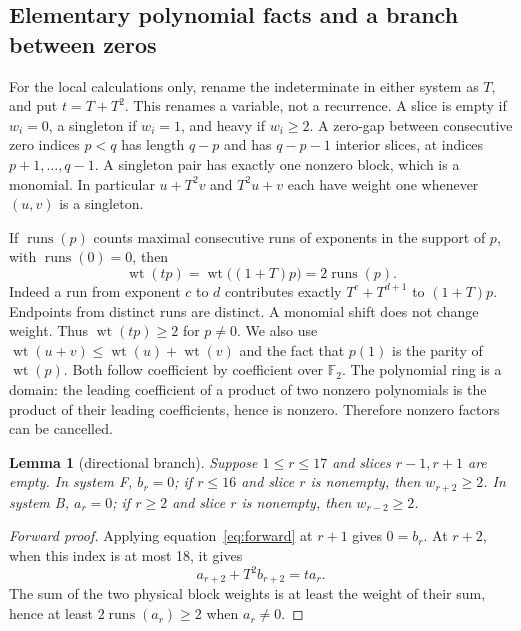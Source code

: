 \documentclass{article}
\newtheorem{lemma}{Lemma}
\DeclareMathOperator{\wt}{wt}
\DeclareMathOperator{\runs}{runs}
\begin{document}
\subsection{Elementary polynomial facts and a branch between zeros}\label{sec:branch}

For the local calculations only, rename the indeterminate in either
system as \(T\), and put \(t = T + T^2\). This renames a variable, not a recurrence.
A slice is empty if \(w_i = 0\), a singleton if \(w_i = 1\), and heavy if \(w_i \ge 2\).
A zero-gap between consecutive zero indices \(p < q\) has length \(q - p\)
and has \(q - p - 1\) interior slices, at indices \(p + 1, \dots, q - 1\).
A singleton pair has exactly one nonzero block, which is a monomial.
In particular \(u + T^2 v\) and \(T^2 u + v\) each have weight one whenever
\((u,v)\) is a singleton.

If \(\runs(p)\) counts maximal consecutive runs of exponents in the support of
\(p\), with \(\runs(0) = 0\), then
\begin{equation}\label{eq:runs}
  \wt(tp) = \wt\bigl((1 + T)p\bigr) = 2 \runs(p).
\end{equation}
Indeed a run from exponent \(c\) to \(d\) contributes exactly \(T^c + T^{d+1}\)
to \((1 + T)p\). Endpoints from distinct runs are distinct. A monomial shift
does not change weight. Thus \(\wt(tp) \ge 2\) for \(p \ne 0\).
We also use \(\wt(u + v) \le \wt(u) + \wt(v)\) and the fact that \(p(1)\) is the parity
of \(\wt(p)\). Both follow coefficient by coefficient over \(\mathbb{F}_2\).
The polynomial ring is a domain: the leading coefficient of a product
of two nonzero polynomials is the product of their leading coefficients,
hence is nonzero. Therefore nonzero factors can be cancelled.

\begin{lemma}[directional branch]\label{lem:branch}
  Suppose \(1 \le r \le 17\) and slices \(r - 1, r + 1\)
  are empty. In system F, \(b_r = 0\); if \(r \le 16\) and slice \(r\) is nonempty,
  then \(w_{r+2} \ge 2\). In system B, \(a_r = 0\); if \(r \ge 2\) and slice \(r\) is
  nonempty, then \(w_{r-2} \ge 2\).
\end{lemma}

\begin{proof}[Forward proof]  Applying equation~\eqref{eq:forward} at \(r + 1\) gives \(0 = b_r\).
  At \(r + 2\), when this index is at most 18, it gives
  \begin{equation}
    a_{r+2} + T^2 b_{r+2} = t a_r.
  \end{equation}
  The sum of the two physical block weights is at least the weight of their
  sum, hence at least \(2 \runs(a_r) \ge 2\) when \(a_r \ne 0\).
\end{proof}
\end{document}
